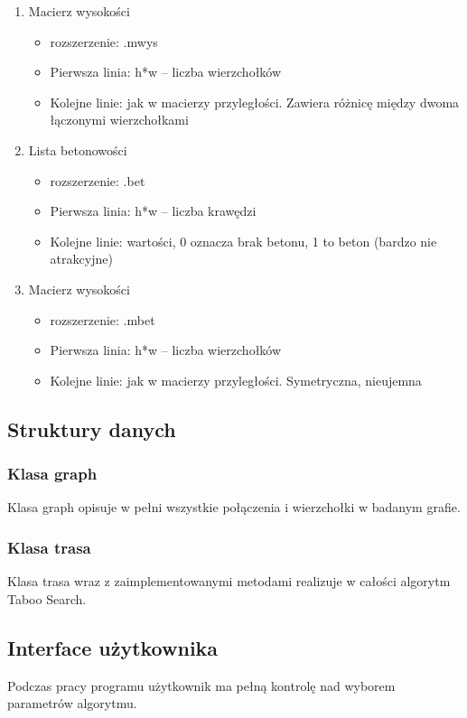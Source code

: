 \documentclass[12pt,a4paper]{article}
\begin{document}
\begin{enumerate}
\begin{itemize}
	\end{itemize}
\item Macierz wysokości
	\begin{itemize}
	\item rozszerzenie: .mwys
	\item Pierwsza linia: h*w -- liczba wierzchołków
	\item Kolejne linie: jak w macierzy przyległości. Zawiera różnicę między dwoma łączonymi wierzchołkami
	\end{itemize}
\item Lista betonowości
	\begin{itemize}
	\item rozszerzenie: .bet
	\item Pierwsza linia: h*w -- liczba krawędzi
	\item Kolejne linie: wartości, 0 oznacza brak betonu, 1 to beton (bardzo nie atrakcyjne)
	\end{itemize}
\item Macierz wysokości
	\begin{itemize}
	\item rozszerzenie: .mbet
	\item Pierwsza linia: h*w -- liczba wierzchołków
	\item Kolejne linie: jak w macierzy przyległości. Symetryczna, nieujemna
	\end{itemize}				
\end{enumerate}

\subsection{Struktury danych}
\subsubsection{Klasa graph}
Klasa graph opisuje w pełni wszystkie połączenia i wierzchołki w badanym grafie.
\subsubsection{Klasa trasa}
Klasa trasa wraz z zaimplementowanymi metodami realizuje w całości algorytm Taboo Search.

\subsection{Interface użytkownika}
Podczas pracy programu użytkownik ma pełną kontrolę nad wyborem parametrów algorytmu. 
\end{document}
